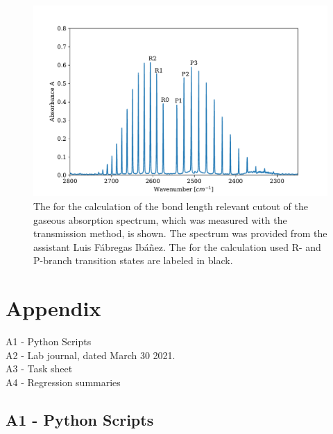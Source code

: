 \documentclass[a4paper,abstracton]{article}	                       %
\begin{document}
\begin{figure}[H]
\centering
 \includegraphics[width=\textwidth] {TeilG.pdf}
\caption{\label{fig:TeilG}The for the calculation of the bond length relevant cutout of the gaseous  absorption spectrum, which was measured with the transmission method, is shown. The spectrum was provided from the assistant Luis F\'abregas Ib\'a\~nez. The for the calculation used R- and P-branch transition states are labeled in black.}
\end{figure}

\pagebreak

\setcounter{biburllcpenalty}{7000}
\setcounter{biburlucpenalty}{8000}
\printbibliography
 
\newpage 
  
\section*{Appendix}
A1 - Python Scripts\\
A2 - Lab journal, dated March 30 2021.\\
A3 - Task sheet \\
A4 - Regression summaries


\subsection*{A1 - Python Scripts}
\end{document}
